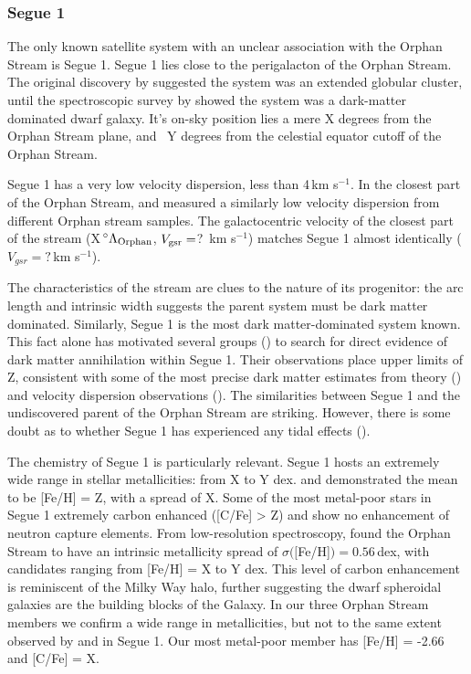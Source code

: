\documentclass{emulateapj}
\begin{document}
\subsubsection{Segue 1}
The only known satellite system with an unclear association with the Orphan Stream is Segue 1. Segue 1 lies close to the perigalacton of the Orphan Stream. The original discovery by \citet{belokurov;et-al_2007a} suggested the system was an extended globular cluster, until the spectroscopic survey by \citet{simon;et-al_2011} showed the system was a dark-matter dominated dwarf galaxy. It's on-sky position lies a mere X degrees from the Orphan Stream plane, and ~Y degrees from the celestial equator cutoff of the Orphan Stream.

Segue 1 has a very low velocity dispersion, less than 4\,km s$^{-1}$. In the closest part of the Orphan Stream, \citet{casey;et-al_2013} and \citet{newberg;et-al_2010} measured a similarly low velocity dispersion from different Orphan stream samples. The galactocentric velocity of the closest part of the stream (X\,$^\circ \Lambda_{\rm Orphan}$, $V_{\rm gsr} = $? \,km s$^{-1}$) matches Segue 1 almost identically ($V_{gsr} = ?$\,km s$^{-1}$). 

The characteristics of the stream are clues to the nature of its progenitor: the arc length and intrinsic width suggests the parent system must be dark matter dominated. Similarly, Segue 1 is the most dark matter-dominated system known. This fact alone has motivated several groups () to search for direct evidence of dark matter annihilation within Segue 1. Their observations place upper limits of Z, consistent with some of the most precise dark matter estimates from theory () and velocity dispersion observations (). The similarities between Segue 1 and the undiscovered parent of the Orphan Stream are striking. However, there is some doubt as to whether Segue 1 has experienced any tidal effects ().


The chemistry of Segue 1 is particularly relevant. Segue 1 hosts an extremely wide range in stellar metallicities: from X to Y dex. \citet{simon;et-al_2011} and \citet{norris;et-al_2010} demonstrated the mean to be [Fe/H] = Z, with a spread of X. Some of the most metal-poor stars in Segue 1 extremely carbon enhanced ([C/Fe] > Z) and show no enhancement of neutron capture elements. From low-resolution spectroscopy, \citet{casey;et-al_2013a} found the Orphan Stream to have an intrinsic metallicity spread of $\sigma([$Fe/H]$) = 0.56$\,dex, with candidates ranging from [Fe/H] = X to Y dex. This level of carbon enhancement is reminiscent of the Milky Way halo, further suggesting the dwarf spheroidal galaxies are the building blocks of the Galaxy. In our three Orphan Stream members we confirm a wide range in metallicities, but not to the same extent observed by \citet{norris;et-al_2010} and \citet{simon;et-al_2011} in Segue 1. Our most metal-poor member has [Fe/H] = -2.66 and [C/Fe] = X. 
\end{document}
